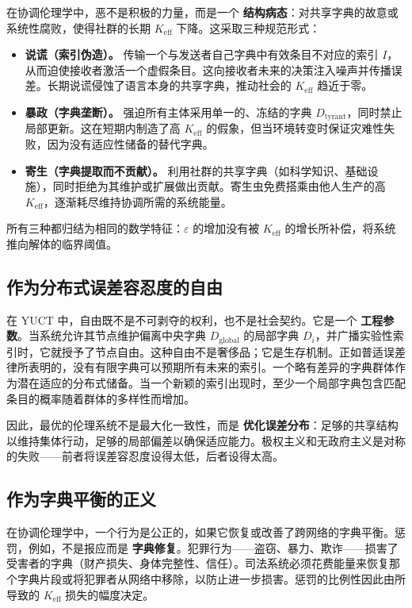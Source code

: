 \documentclass[12pt,a4paper]{article}
\begin{document}
	在协调伦理学中，恶不是积极的力量，而是一个 \textbf{结构病态}：对共享字典的故意或系统性腐败，使得社群的长期 \(K_{\mathrm{eff}}\) 下降。这采取三种规范形式：
	
	\begin{itemize}[leftmargin=*]
		\item \textbf{说谎（索引伪造）。} 传输一个与发送者自己字典中有效条目不对应的索引 \(I\)，从而迫使接收者激活一个虚假条目。这向接收者未来的决策注入噪声并传播误差。长期说谎侵蚀了语言本身的共享字典，推动社会的 \(K_{\mathrm{eff}}\) 趋近于零。
		\item \textbf{暴政（字典垄断）。} 强迫所有主体采用单一的、冻结的字典 \(D_{\text{tyrant}}\)，同时禁止局部更新。这在短期内制造了高 \(K_{\mathrm{eff}}\) 的假象，但当环境转变时保证灾难性失败，因为没有适应性储备的替代字典。
		\item \textbf{寄生（字典提取而不贡献）。} 利用社群的共享字典（如科学知识、基础设施），同时拒绝为其维护或扩展做出贡献。寄生虫免费搭乘由他人生产的高 \(K_{\mathrm{eff}}\)，逐渐耗尽维持协调所需的系统能量。
	\end{itemize}
	
	所有三种都归结为相同的数学特征：\(\varepsilon\) 的增加没有被 \(K_{\mathrm{eff}}\) 的增长所补偿，将系统推向解体的临界阈值。
	
	\subsection{作为分布式误差容忍度的自由}
	
	在 YUCT 中，自由既不是不可剥夺的权利，也不是社会契约。它是一个 \textbf{工程参数}。当系统允许其节点维护偏离中央字典 \(D_{\text{global}}\) 的局部字典 \(D_i\)，并广播实验性索引时，它就授予了节点自由。这种自由不是奢侈品；它是生存机制。正如普适误差律所表明的，没有有限字典可以预期所有未来的索引。一个略有差异的字典群体作为潜在适应的分布式储备。当一个新颖的索引出现时，至少一个局部字典包含匹配条目的概率随着群体的多样性而增加。
	
	因此，最优的伦理系统不是最大化一致性，而是 \textbf{优化误差分布}：足够的共享结构以维持集体行动，足够的局部偏差以确保适应能力。极权主义和无政府主义是对称的失败——前者将误差容忍度设得太低，后者设得太高。
	
	\subsection{作为字典平衡的正义}
	
	在协调伦理学中，一个行为是公正的，如果它恢复或改善了跨网络的字典平衡。惩罚，例如，不是报应而是 \textbf{字典修复}。犯罪行为——盗窃、暴力、欺诈——损害了受害者的字典（财产损失、身体完整性、信任）。司法系统必须花费能量来恢复那个字典片段或将犯罪者从网络中移除，以防止进一步损害。惩罚的比例性因此由所导致的 \(K_{\mathrm{eff}}\) 损失的幅度决定。
	
\end{document}
